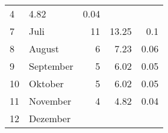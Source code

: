 \begin{longtable}{lXrrr}
       \num{4} &
       \num[round-mode=places,round-precision=2]{4,82} &
         \num[round-mode=places,round-precision=2]{0,04} \\

     7 &
     \multicolumn{1}{X}{ Juli   } &


       \num{11} &
       \num[round-mode=places,round-precision=2]{13,25} &
         \num[round-mode=places,round-precision=2]{0,1} \\

     8 &
     \multicolumn{1}{X}{ August   } &


       \num{6} &
       \num[round-mode=places,round-precision=2]{7,23} &
         \num[round-mode=places,round-precision=2]{0,06} \\

     9 &
     \multicolumn{1}{X}{ September   } &


       \num{5} &
       \num[round-mode=places,round-precision=2]{6,02} &
         \num[round-mode=places,round-precision=2]{0,05} \\

     10 &
     \multicolumn{1}{X}{ Oktober   } &


       \num{5} &
       \num[round-mode=places,round-precision=2]{6,02} &
         \num[round-mode=places,round-precision=2]{0,05} \\

     11 &
     \multicolumn{1}{X}{ November   } &


       \num{4} &
       \num[round-mode=places,round-precision=2]{4,82} &
         \num[round-mode=places,round-precision=2]{0,04} \\

     12 &
     \multicolumn{1}{X}{ Dezember   } &



\end{longtable}
